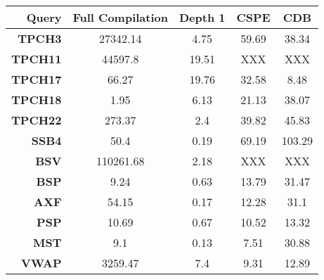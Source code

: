 \begin{tabular}{|r|cccc|}\hline 
Query & Full Compilation & Depth 1 & CSPE & CDB\\ \hline 
{\bf TPCH3} & 27342.14 & 4.75 & 59.69 & 38.34\\ \hline 
{\bf TPCH11} & 44597.8 & 19.51 & XXX & XXX\\ \hline 
{\bf TPCH17} & 66.27 & 19.76 & 32.58 & 8.48\\ \hline 
{\bf TPCH18} & 1.95 & 6.13 & 21.13 & 38.07\\ \hline 
{\bf TPCH22} & 273.37 & 2.4 & 39.82 & 45.83\\ \hline 
{\bf SSB4} & 50.4 & 0.19 & 69.19 & 103.29\\ \hline 
{\bf BSV} & 110261.68 & 2.18 & XXX & XXX\\ \hline 
{\bf BSP} & 9.24 & 0.63 & 13.79 & 31.47\\ \hline 
{\bf AXF} & 54.15 & 0.17 & 12.28 & 31.1\\ \hline 
{\bf PSP} & 10.69 & 0.67 & 10.52 & 13.32\\ \hline 
{\bf MST} & 9.1 & 0.13 & 7.51 & 30.88\\ \hline 
{\bf VWAP} & 3259.47 & 7.4 & 9.31 & 12.89\\ \hline 
\end{tabular}